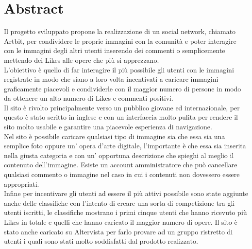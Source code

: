 \documentclass[openany, a4paper, 12pt]{report}
\begin{document}


	\chapter{Abstract}
	Il progetto sviluppato propone la realizzazione di un social network, chiamato Artbit, per condividere le proprie immagini con la comunità e poter interagire con le immagini degli altri utenti inserendo dei commenti o semplicemente mettendo dei Likes alle opere che più si apprezzano.\\
	L'obiettivo è quello di far interagire il più possibile gli utenti con le immagini registrate in modo che siano a loro volta incentivati a caricare immagini graficamente piacevoli e condividerle con il maggior numero di persone in modo da ottenere un alto numero di Likes e commenti positivi.\\
	 Il sito è rivolto principalmente verso un pubblico giovane ed internazionale, per questo è stato scritto in inglese e con un interfaccia molto pulita per rendere il sito molto usabile e garantire una piacevole esperienza di navigazione.\\
	Nel sito è possibile caricare qualsiasi tipo di immagine sia che essa sia una semplice foto oppure un' opera d'arte digitale, l'importante è che essa sia inserita nella giusta categoria e con un' opportuna descrizione che spieghi al meglio il contenuto dell'immagine.
	Esiste un account amministratore che può cancellare qualsiasi commento o immagine nel caso in cui i contenuti non dovessero essere appropriati.\\
	Infine per incentivare gli utenti ad essere il più attivi possibile sono state aggiunte anche delle classifiche con l'intento di creare una sorta di competizione tra gli utenti iscritti, le classifiche mostrano i primi cinque utenti che hanno ricevuto più Likes in totale e quelli che hanno caricato il maggior numero di opere.
	Il sito è stato anche caricato su Altervista per farlo provare ad un gruppo ristretto di utenti i quali sono stati molto soddisfatti dal prodotto realizzato.
\end{document}
